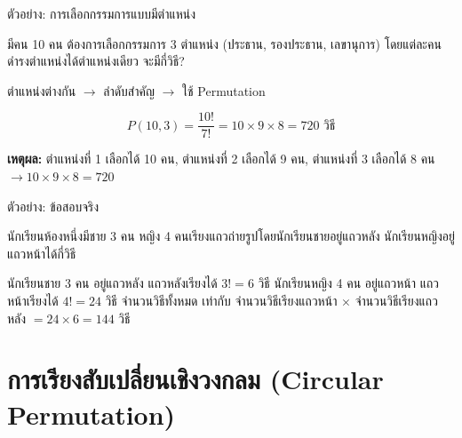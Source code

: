 \documentclass[11pt, aspectratio=169]{beamer}
\begin{document}
\begin{frame}{ตัวอย่าง: การเลือกกรรมการแบบมีตำแหน่ง}
  \begin{exambox}[โจทย์]
    มีคน 10 คน ต้องการเลือกกรรมการ 3 ตำแหน่ง (ประธาน, รองประธาน, เลขานุการ)
    โดยแต่ละคนดำรงตำแหน่งได้ตำแหน่งเดียว จะมีกี่วิธี?
  \end{exambox}

  \begin{solbox}[วิธีทำ]
    ตำแหน่งต่างกัน $\rightarrow$ ลำดับสำคัญ $\rightarrow$ ใช้ Permutation

    \[
      P(10, 3) = \frac{10!}{7!} = 10 \times 9 \times 8 = 720 \text{ วิธี}
    \]

    \medskip
    \textbf{เหตุผล:} ตำแหน่งที่ 1 เลือกได้ 10 คน, ตำแหน่งที่ 2 เลือกได้ 9 คน,
    ตำแหน่งที่ 3 เลือกได้ 8 คน $\rightarrow 10 \times 9 \times 8 = 720$
  \end{solbox}
\end{frame}

\begin{frame}{ตัวอย่าง: ข้อสอบจริง}
  \begin{exambox}[โจทย์ปี 67 ข้อ 31]
    นักเรียนห้องหนึ่งมีชาย 3 คน หญิง 4 คนเรียงแถวถ่ายรูปโดยนักเรียนชายอยู่แถวหลัง นักเรียนหญิงอยู่แถวหน้าได้กี่วิธี
  \end{exambox}

  \begin{solbox}[วิธีทำ]
    นักเรียนชาย 3 คน อยู่แถวหลัง แถวหลังเรียงได้ $3!=6$ วิธี \newline
    นักเรียนหญิง 4 คน อยู่แถวหน้า แถวหน้าเรียงได้ $4!=24$ วิธี \newline
    จำนวนวิธีทั้งหมด เท่ากับ จำนวนวิธีเรียงแถวหน้า $\times$ จำนวนวิธีเรียงแถวหลัง $=24 \times 6=144$ วิธี
  \end{solbox}
\end{frame}

\section{การเรียงสับเปลี่ยนเชิงวงกลม (Circular Permutation)}
\end{document}
